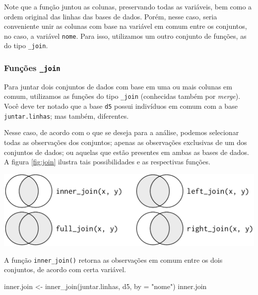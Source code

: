 \documentclass[
  brazilian,
]{book}
\newenvironment{Shaded}{\begin{snugshade}}{\end{snugshade}}
\newcommand{\AttributeTok}[1]{\textcolor[rgb]{0.77,0.63,0.00}{#1}}
\newcommand{\FunctionTok}[1]{\textcolor[rgb]{0.00,0.00,0.00}{#1}}
\newcommand{\NormalTok}[1]{#1}
\newcommand{\OtherTok}[1]{\textcolor[rgb]{0.56,0.35,0.01}{#1}}
\newcommand{\StringTok}[1]{\textcolor[rgb]{0.31,0.60,0.02}{#1}}
\let\origfigure\figure
\let\endorigfigure\endfigure
\renewenvironment{figure}[1][2] {
    \expandafter\origfigure\expandafter[H]
} {
    \endorigfigure
}
\begin{document}
Note que a função juntou as colunas, preservando todas as variáveis, bem como a ordem original das linhas das bases de dados. Porém, nesse caso, seria conveniente unir as colunas com base na variável em comum entre os conjuntos, no caso, a variável \texttt{nome}. Para isso, utilizamos um outro conjunto de funções, as do tipo \texttt{\_join}.

\hypertarget{funuxe7uxf5es-_join}{%
\subsubsection*{\texorpdfstring{Funções \texttt{\_join}}{Funções \_join}}\label{funuxe7uxf5es-_join}}

Para juntar dois conjuntos de dados com base em uma ou mais colunas em comum, utilizamos as funções do tipo \texttt{\_join} (conhecidas também por \emph{merge}). Você deve ter notado que a base \texttt{d5} possui indivíduos em comum com a base \texttt{juntar.linhas}; mas também, diferentes.

Nesse caso, de acordo com o que se deseja para a análise, podemos selecionar todas as observações dos conjuntos; apenas as observações exclusivas de um dos conjuntos de dados; ou aquelas que estão presentes em ambas as bases de dados. A figura \ref{fig:join} ilustra tais possibilidades e as respectivas funções.

\begin{figure}

{\centering \includegraphics[width=0.7\linewidth]{imagens/join-venn} 

}

\caption{Diagrama de Venn com os tipos de joins. Fonte: R for Data Science, 2017.}\label{fig:join}
\end{figure}

A função \texttt{inner\_join()} retorna as observações em comum entre os dois conjuntos, de acordo com certa variável.

\begin{Shaded}
\begin{Highlighting}[]
\NormalTok{inner.join }\OtherTok{\textless{}{-}} \FunctionTok{inner\_join}\NormalTok{(juntar.linhas, d5,}
                         \AttributeTok{by =} \StringTok{"nome"}\NormalTok{)}
\NormalTok{inner.join}
\end{Highlighting}
\end{Shaded}
\end{document}
